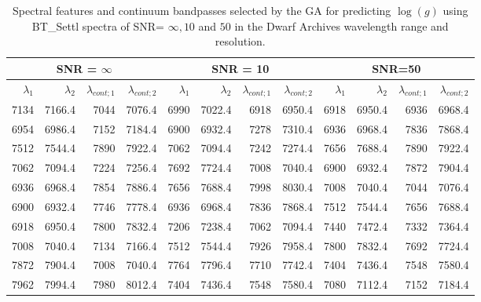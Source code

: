 \begin{table*}
\begin{center}
\begin{tabular}{rrrr | rrrr | rrrr}
  \hline
 \multicolumn{4}{c}{SNR = $\infty $} & \multicolumn{4}{c}{SNR = 10} &  \multicolumn{4}{c}{SNR=50} \\
  \hline
$\lambda_1$ & $\lambda_2$ & $\lambda_{cont;1}$ & $\lambda_{cont;2} $ & $\lambda_1$ & $\lambda_2$ & $\lambda_{cont;1}$ & $\lambda_{cont;2} $ & $\lambda_1$ & $\lambda_2$ & $\lambda_{cont;1}$ & $\lambda_{cont;2} $ \\ 
  \hline
7134 & 7166.4 &	7044 & 7076.4 & 6990 & 7022.4 &	6918 & 6950.4 & 6918 & 6950.4 & 6936 & 6968.4  \\
6954 & 6986.4 &	7152 & 7184.4 & 6900 & 6932.4 &	7278 & 7310.4 & 6936 & 6968.4 & 7836 & 7868.4  \\
7512 & 7544.4 &	7890 & 7922.4 & 7062 & 7094.4 &	7242 & 7274.4 & 7656 & 7688.4 & 7890 & 7922.4  \\
7062 & 7094.4 &	7224 & 7256.4 & 7692 & 7724.4 &	7008 & 7040.4 & 6900 & 6932.4 & 7872 & 7904.4  \\
6936 & 6968.4 &	7854 & 7886.4 & 7656 & 7688.4 &	7998 & 8030.4 & 7008 & 7040.4 & 7044 & 7076.4  \\
6900 & 6932.4 &	7746 & 7778.4 & 6936 & 6968.4 &	7836 & 7868.4 & 7512 & 7544.4 & 7656 & 7688.4  \\
6918 & 6950.4 &	7800 & 7832.4 & 7206 & 7238.4 &	7062 & 7094.4 & 7440 & 7472.4 & 7332 & 7364.4  \\
7008 & 7040.4 &	7134 & 7166.4 & 7512 & 7544.4 &	7926 & 7958.4 & 7800 & 7832.4 & 7692 & 7724.4  \\
7872 & 7904.4 &	7008 & 7040.4 & 7764 & 7796.4 &	7710 & 7742.4 & 7404 & 7436.4 & 7548 & 7580.4  \\
7962 & 7994.4 &	7980 & 8012.4 & 7404 & 7436.4 &	7548 & 7580.4 & 7080 & 7112.4 & 7152 & 7184.4  \\
   \hline
\end{tabular}
\caption {Spectral features and continuum bandpasses selected by the
  GA for predicting $\log(g)$ using BT\_Settl spectra of SNR= $\infty , 10 $ and $ 50 $
  in the Dwarf Archives wavelength range and
  resolution.} \label{tab:ipac-logg-noisy}
\end{center}
\end{table*}


